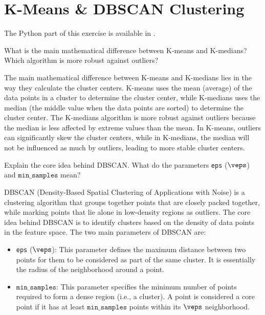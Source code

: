 \section{K-Means \& DBSCAN Clustering}

The Python part of this exercise is available in .\\

\begin{ejercicio}
    What is the main mathematical difference between K-means and K-medians? Which algorithm is more robust against outliers?

    The main mathematical difference between K-means and K-medians lies in the way they calculate the cluster centers. K-means uses the mean (average) of the data points in a cluster to determine the cluster center, while K-medians uses the median (the middle value when the data points are sorted) to determine the cluster center. The K-medians algorithm is more robust against outliers because the median is less affected by extreme values than the mean. In K-means, outliers can significantly skew the cluster centers, while in K-medians, the median will not be influenced as much by outliers, leading to more stable cluster centers.
\end{ejercicio}

\begin{ejercicio}
    Explain the core idea behind DBSCAN. What do the parameters \texttt{eps} ($\veps$) and $\texttt{min\_samples}$ mean?

    DBSCAN (Density-Based Spatial Clustering of Applications with Noise) is a clustering algorithm that groups together points that are closely packed together, while marking points that lie alone in low-density regions as outliers. The core idea behind DBSCAN is to identify clusters based on the density of data points in the feature space. The two main parameters of DBSCAN are:
    \begin{itemize}
        \item \texttt{eps} ($\veps$): This parameter defines the maximum distance between two points for them to be considered as part of the same cluster. It is essentially the radius of the neighborhood around a point.
        \item $\texttt{min\_samples}$: This parameter specifies the minimum number of points required to form a dense region (i.e., a cluster). A point is considered a core point if it has at least $\texttt{min\_samples}$ points within its $\veps$ neighborhood.
    \end{itemize}
\end{ejercicio}

